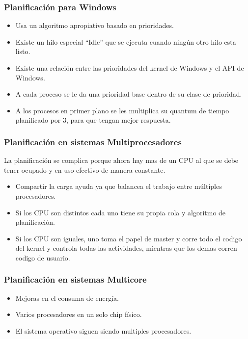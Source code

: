 \documentclass{beamer}
\begin{document}
\begin{frame}
\frametitle{Planificación para Windows}

\begin{itemize}
	\item Usa un algoritmo apropiativo basado en prioridades.
	\item Existe un hilo especial ``Idle'' que se ejecuta cuando ningún otro hilo esta listo.
	\item Existe una relación entre las prioridades del kernel de Windows y el API de Windows.
	\item A cada proceso se le da una prioridad base dentro de su clase de prioridad.
	\item A los procesos en primer plano se les multiplica su quantum de tiempo planificado
	por 3, para que tengan mejor respuesta.
\end{itemize}
\end{frame}


\begin{frame}
	\frametitle{Planificación en sistemas Multiprocesadores}
	
	La planificación se complica porque ahora hay mas de un CPU al que se debe tener ocupado y en uso
	efectivo de manera constante.
	
	\begin{itemize}
		\item Compartir la carga ayuda ya que balancea el trabajo entre múltiples procesadores.
		\item Si los CPU son distintos cada uno tiene su propia cola y algoritmo de planificación.
		\item Si los CPU son iguales, uno toma el papel de master y corre todo el codigo del kernel
		y controla todas las actividades, mientras que los demas corren codigo de usuario.
	\end{itemize}
\end{frame}


\begin{frame}
	\frametitle{Planificación en sistemas Multicore}
	
	\begin{itemize}
		\item Mejoras en el consuma de energía.
		\item Varios procesadores en un solo chip físico.
		\item El sistema operativo siguen siendo multiples procesadores.
	\end{itemize}
\end{frame}
\end{document}
